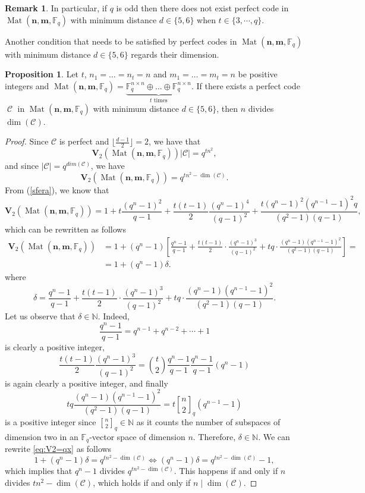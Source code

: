 \documentclass[11pt]{amsart}
\DeclareMathOperator{\C}{\mathcal{C}}
\DeclareMathOperator{\Mat}{Mat}
\theoremstyle{definition}
\newtheorem{proposition}[theorem]{Proposition}
\newtheorem{remark}[theorem]{Remark}
\newcommand{\F}{{\mathbb F}}
\newcommand{\NN}{{\mathbb N}}
\newcommand{\bfn}{\mathbf {n}}
\newcommand{\bfm}{\mathbf {m}}
\newcommand{\fq}{{\mathbb F}_{q}}
\newcommand{\spacmn}{\Mat(\bfn,\bfm,\F_q)}
\newcommand{\qbinom}[2]{\genfrac{[}{]}{0pt}{}{#1}{#2}_q}
\begin{document}
\begin{remark}
In particular, if $q$ is odd then there does not exist perfect code in $\spacmn$ with minimum distance $d \in \{5,6\}$ when $t\in\{3,\cdots,q\}$.
\end{remark}

Another condition that needs to be satisfied by perfect codes in $\spacmn$ with minimum distance $d \in \{5,6\}$ regards their dimension.

\begin{proposition}\label{prop:n|dim}
Let $t$, $ n_1 = \ldots = n_t = n $ and $ m_1 = \ldots = m_t = n $ be positive integers and $\spacmn=\underbrace{\mathbb{F}_q^{n\times n}\oplus \ldots \oplus \F_q^{n\times n}}_{t \text{ times}}$.
If there exists a perfect code $\C$ in $\spacmn$ with minimum distance $d \in \{5,6\}$, then $n$ divides $\dim(\mathcal{C})$.
\end{proposition}
\begin{proof}
Since $\mathcal{C}$ is perfect and $\lfloor\frac{d-1}{2}\rfloor=2$, we have that
\[
\mathbf{V}_2(\spacmn)\lvert\mathcal{C}\rvert=q^{tn^2},
\]
and since $\lvert\mathcal{C}\rvert=q^{dim(\mathcal{C})}$, we have
\begin{equation}\label{eq:V2=qx}
\mathbf{V}_2(\spacmn)=q^{tn^2-\dim(\mathcal{C})}.
\end{equation}
From (\ref{sfera}), we know that
\[
\mathbf{V}_2(\spacmn)=1+t\frac{(q^n-1)^2}{q-1}+\frac{t(t-1)}{2}\frac{(q^n-1)^4}{(q-1)^2}+\frac{t(q^n-1)^2(q^{n-1}-1)^2q}{(q^2-1)(q-1)},
\]
which can be rewritten as follows
\[
\begin{aligned}
\mathbf{V}_2(\spacmn)&=1+(q^n-1)\left[\frac{q^n-1}{q-1}+\frac{t(t-1)}{2}\cdot\frac{(q^n-1)^3}{(q-1)^2}+tq\cdot\frac{(q^n-1)(q^{n-1}-1)^2}{(q^2-1)(q-1)}\right]=\\&=1+(q^n-1)\delta.
\end{aligned}
\]
where
\[
\delta=\frac{q^n-1}{q-1}+\frac{t(t-1)}{2}\cdot\frac{(q^n-1)^3}{(q-1)^2}+tq\cdot\frac{(q^n-1)(q^{n-1}-1)^2}{(q^2-1)(q-1)}.
\]
Let us observe that $\delta \in \NN$. Indeed,
\[
\frac{q^n-1}{q-1}=q^{n-1}+q^{n-2}+\cdots+1
\]
is clearly a positive integer, 
\[
\frac{t(t-1)}{2}\frac{(q^n-1)^3}{(q-1)^2}=\binom{t}{2}\frac{q^n-1}{q-1}\frac{q^n-1}{q-1}(q^n-1)
\]
is again clearly a positive integer, and finally
\[
tq\frac{(q^n-1)(q^{n-1}-1)^2}{(q^2-1)(q-1)}=t\qbinom{n}{2}(q^{n-1}-1)
\]
is a positive integer since $\qbinom{n}{2} \in \NN$ as it counts the number of subspaces of dimension two in an $\fq$-vector space of dimension $n$. Therefore, $\delta \in \NN$.
We can rewrite \eqref{eq:V2=qx} as follows
\[
1+(q^n-1)\delta=q^{tn^2-\dim(\mathcal{C})}\iff (q^n-1)\delta=q^{tn^2-\dim(\mathcal{C})}-1,
\]
which implies that $q^n-1$ divides $q^{tn^2-\dim(\mathcal{C})}$. This happens if and only if $n$ divides $tn^2-\dim(\mathcal{C})$, which holds if and only if $n \mid \dim(\mathcal{C})$.
\end{proof}
\end{document}
